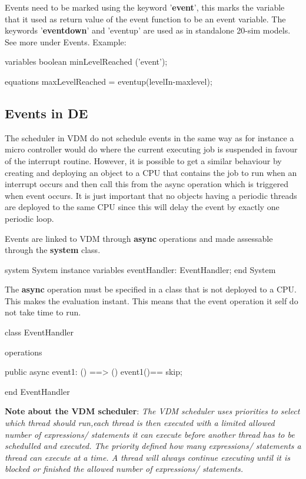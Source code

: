 \documentclass{crescendorepchap}
\newcommand{\vdmkeyw}[1]{{\bf\ttfamily #1}}
\begin{document}
Events need to be marked using the keyword '\vdmkeyw{event}', this marks the
variable that it used as return value of the event function to be an
event variable. The keywords '\vdmkeyw{eventdown}' and 'eventup' are used as in
standalone 20-sim models. See more under Events. Example:

\begin{dcl}
variables
  boolean minLevelReached ('event');

equations
  maxLevelReached = eventup(levelIn-maxlevel);
\end{dcl}

\subsection{Events in DE}

The scheduler in VDM do not schedule events in the same way as for
instance a micro controller would do where the current executing job is
suspended in favour of the interrupt routine. However, it is possible to
get a similar behaviour by creating and deploying an object to a CPU
that contains the job to run when an interrupt occurs and then call this
from the async operation which is triggered when event occurs. It is
just important that no objects having a periodic threads are deployed to
the same CPU since this will delay the event by exactly one periodic
loop.

Events are linked to VDM through \vdmkeyw{async} operations and made assessable
through the \vdmkeyw{system} class.

\begin{vdmrt}
system System
instance variables
  eventHandler: EventHandler;
end System
\end{vdmrt}

The \vdmkeyw{async} operation must be specified in a class that is not deployed to
a CPU. This makes the evaluation instant. This means that the event
operation it self do not take time to run.

\begin{vdmrt}
class EventHandler

operations

public async event1: () ==> ()
event1()== skip;

end EventHandler
\end{vdmrt}

\textbf{Note about the VDM scheduler}: \emph{The VDM scheduler uses
priorities to select which thread should run,each thread is then
executed with a limited allowed number of expressions/ statements it can
execute before another thread has to be schedulled and executed. The
priority defined how many expressions/ statements a thread can execute
at a time. A thread will always continue executing until it is blocked
or finished the allowed number of expressions/ statements.}
\end{document}
